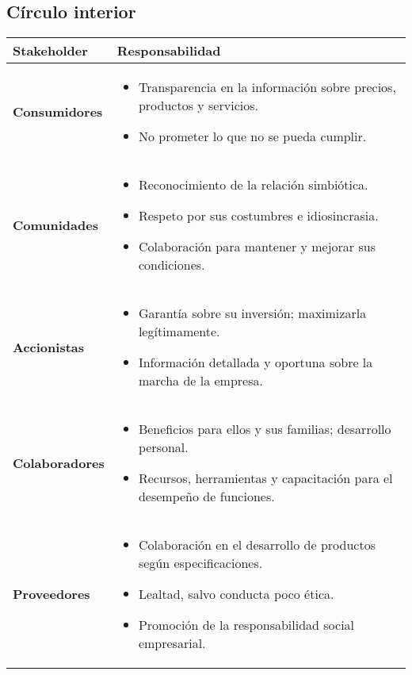 \documentclass[a4paber,12pt]{article}
\begin{document}
	\subsection{Círculo interior}
	
	\begin{longtable}{>{\raggedright\arraybackslash}p{4cm} >{\raggedright\arraybackslash}p{11cm}}
		\toprule
		\textbf{Stakeholder} & \textbf{Responsabilidad} \\
		\midrule
		\textbf{Consumidores} & 
		\begin{itemize}
			\item Transparencia en la información sobre precios, productos y servicios.
			\item No prometer lo que no se pueda cumplir.
		\end{itemize} \\
		\textbf{Comunidades} & 
		\begin{itemize}
			\item Reconocimiento de la relación simbiótica.
			\item Respeto por sus costumbres e idiosincrasia.
			\item Colaboración para mantener y mejorar sus condiciones.
		\end{itemize} \\
		\textbf{Accionistas} & 
		\begin{itemize}
			\item Garantía sobre su inversión; maximizarla legítimamente.
			\item Información detallada y oportuna sobre la marcha de la empresa.
		\end{itemize} \\
		\textbf{Colaboradores} & 
		\begin{itemize}
			\item Beneficios para ellos y sus familias; desarrollo personal.
			\item Recursos, herramientas y capacitación para el desempeño de funciones.
		\end{itemize} \\
		\textbf{Proveedores} & 
		\begin{itemize}
			\item Colaboración en el desarrollo de productos según especificaciones.
			\item Lealtad, salvo conducta poco ética.
			\item Promoción de la responsabilidad social empresarial.
		\end{itemize} \\
		\bottomrule
	\end{longtable}
	\newpage
	
\end{document}
